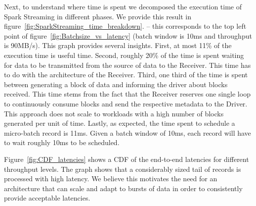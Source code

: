 Next, to understand where time is spent we decomposed the execution time of Spark Streaming in different phases.
We provide this result in figure~\ref{fig:SparkStreaming_time_breakdown}. 
-- this corresponds to the top left point of figure~\ref{fig:Batchsize_vs_latency} (batch window is 10ms and throughput is 90MB/s).
This graph provides several insights. 
First, at most 11\% of the execution time is useful time.
Second, roughly 20\% of the time is spent waiting for data to be transmitted from the source of data to the Receiver.
This time has to do with the architecture of the Receiver.
Third, one third of the time is spent between generating a block of data and informing the driver about blocks received.
This time stems from the fact that the Receiver reserves one single loop to continuously consume blocks and send the respective metadata to the Driver.
This approach does not scale to workloads with a high number of blocks generated per unit of time.
Lastly, as expected, the time spent to schedule a micro-batch record is 11ms. Given a batch window of 10ms, each record will have to wait roughly 10ms to be scheduled.

Figure~\ref{fig:CDF_latencies} shows a CDF of the end-to-end latencies for different throughput levels. The graph shows that a considerably sized tail of records is processed with high latency.
We believe this motivates the need for an architecture that can scale and adapt to bursts of data in order to consistently provide acceptable latencies.
